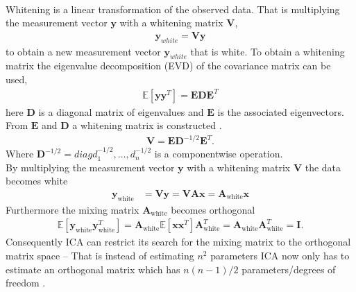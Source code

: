 \\
Whitening is a linear transformation of the observed data. That is multiplying the measurement vector $\textbf{y}$ with a whitening matrix $\textbf{V}$,
\begin{align*}
\textbf{y}_{white} = \textbf{V}\textbf{y}
\end{align*} 
to obtain a new measurement vector $\textbf{y}_{white}$ that is white. To obtain a whitening matrix the eigenvalue decomposition (EVD) of the covariance matrix can be used,
\begin{align*}
\mathbb{E}[\mathbf{yy}^T] = \mathbf{EDE}^T
\end{align*}
here $\mathbf{D}$ is a diagonal matrix of eigenvalues and $\mathbf{E}$ is the associated eigenvectors. From $\mathbf{E}$ and $\mathbf{D}$ a whitening matrix is constructed \cite[p.159]{ICA}.
\begin{align*}
\mathbf{V} = \mathbf{ED}^{-1/2} \mathbf{E}^T.
\end{align*}
Where $\mathbf{D}^{-1/2}=diag{d_1^{-1/2},\hdots,d_n^{-1/2}}$ is a componentwise operation.\\  
By multiplying the measurement vector $\mathbf{y}$ with a whitening matrix $\mathbf{V}$ the data becomes white
\begin{align}
\mathbf{y}_{\text{white}} &= \mathbf{Vy} = \mathbf{VAx} = \mathbf{A}_{\text{white}} \mathbf{x} \nonumber
\end{align}
Furthermore the mixing matrix $\mathbf{A}_{\text{white}}$ becomes orthogonal 
\begin{align*}
 \mathbb{E}[\mathbf{y}_{\text{white}} \mathbf{y}_{\text{white}}^T] = \mathbf{A}_{\text{white}} \mathbb{E}[\mathbf{xx}^T] \mathbf{A}_{\text{white}}^T = \mathbf{A}_{\text{white}} \mathbf{A}_{\text{white}}^T = \mathbf{I}.
 \end{align*} 
Consequently ICA can restrict its search for the mixing matrix to the orthogonal matrix space -- That is instead of estimating $n^2$ parameters ICA now only has to estimate an orthogonal matrix which has $n(n-1)/2$ parameters/degrees of freedom \cite[p. 159]{ICA}
.

